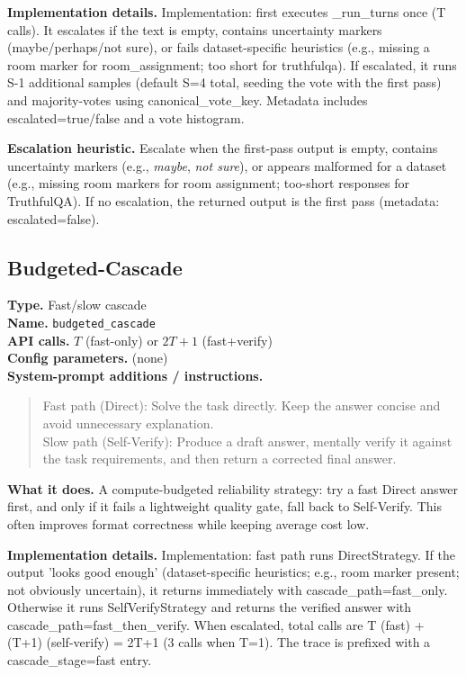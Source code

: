 \documentclass[10pt,twocolumn]{article}
\begin{document}
\noindent\textbf{Implementation details.} Implementation: first executes \_run\_turns once (T calls). It escalates if the text is empty, contains uncertainty markers (maybe/perhaps/not sure), or fails dataset-specific heuristics (e.g., missing a room marker for room\_assignment; too short for truthfulqa). If escalated, it runs S-1 additional samples (default S=4 total, seeding the vote with the first pass) and majority-votes using canonical\_vote\_key. Metadata includes escalated=true/false and a vote histogram.

\noindent\textbf{Escalation heuristic.} Escalate when the first-pass output is empty, contains uncertainty markers (e.g., \emph{maybe}, \emph{not sure}), or appears malformed for a dataset (e.g., missing room markers for room assignment; too-short responses for TruthfulQA). If no escalation, the returned output is the first pass (metadata: escalated=false).

\subsection*{Budgeted-Cascade}
\noindent\textbf{Type.} Fast/slow cascade\\
\textbf{Name.} \texttt{budgeted\_\hspace{0pt}cascade}\\
\textbf{API calls.} $T$ (fast-only) or $2T + 1$ (fast+verify)\\
\textbf{Config parameters.} (none)\\

\noindent\textbf{System-prompt additions / instructions.}
\begin{quote}\footnotesize
Fast path (Direct): Solve the task directly. Keep the answer concise and avoid unnecessary explanation.
\\
Slow path (Self-Verify): Produce a draft answer, mentally verify it against the task requirements, and then return a corrected final answer.
\end{quote}
\noindent\textbf{What it does.} A compute-budgeted reliability strategy: try a fast Direct answer first, and only if it fails a lightweight quality gate, fall back to Self-Verify. This often improves format correctness while keeping average cost low.

\noindent\textbf{Implementation details.} Implementation: fast path runs DirectStrategy. If the output 'looks good enough' (dataset-specific heuristics; e.g., room marker present; not obviously uncertain), it returns immediately with cascade\_path=fast\_only. Otherwise it runs SelfVerifyStrategy and returns the verified answer with cascade\_path=fast\_then\_verify. When escalated, total calls are T (fast) + (T+1) (self-verify) = 2T+1 (3 calls when T=1). The trace is prefixed with a cascade\_stage=fast entry.
\end{document}
